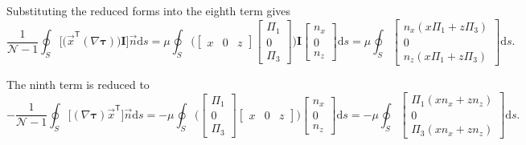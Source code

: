 \documentclass[wes, manuscript]{copernicus}
\begin{document}
Substituting the reduced forms into the eighth term gives
%
\begin{equation}
\frac{1}{\mathscr{N}-1}\!\oint_S
\Big[\big(\vec{x}^{\mathsf T}(\nabla \boldsymbol{\tau})\big)\mathbf{I}\Big]\vec{n} \textrm{d}s
= \mu\!\oint_S
\Bigg(\begin{bmatrix} x & 0 & z \end{bmatrix}
\begin{bmatrix} \Pi_1 \\ 0 \\ \Pi_3 \end{bmatrix}\Bigg)\mathbf{I}
\begin{bmatrix} n_{x} \\ 0 \\ n_{z} \end{bmatrix}\textrm{d}s
= \mu\!\oint_S
\begin{bmatrix}
n_{x} (x\Pi_1+z\Pi_3)\\[2pt]
0\\[2pt]
n_{z} (x\Pi_1+z\Pi_3)
\end{bmatrix} \textrm{d}s .
\end{equation}
%

The ninth term is reduced to
%
\begin{equation}
-\frac{1}{\mathscr{N}-1}\!\oint_S
\Big[(\nabla\boldsymbol{\tau}) \vec{x}^{\mathsf T}\Big]\vec{n} \textrm{d}s
= -\mu\!\oint_S
\Bigg(
\begin{bmatrix} \Pi_1 \\ 0 \\ \Pi_3 \end{bmatrix}
\begin{bmatrix} x & 0 & z \end{bmatrix}
\Bigg)
\begin{bmatrix} n_{x} \\ 0 \\ n_{z} \end{bmatrix}\textrm{d}s
= -\mu\!\oint_S
\begin{bmatrix}
\Pi_1 (x n_{x}+z n_{z})\\[2pt]
0\\[2pt]
\Pi_3 (x n_{x}+z n_{z})
\end{bmatrix}\textrm{d}s .
\end{equation}
%
\end{document}
